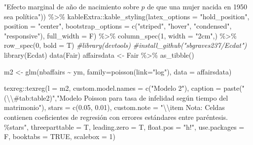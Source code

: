 \documentclass[
  12pt,
  a4paper,
]{article}
\newenvironment{Shaded}{\begin{snugshade}}{\end{snugshade}}
\newcommand{\AttributeTok}[1]{\textcolor[rgb]{0.77,0.63,0.00}{#1}}
\newcommand{\CommentTok}[1]{\textcolor[rgb]{0.56,0.35,0.01}{\textit{#1}}}
\newcommand{\ConstantTok}[1]{\textcolor[rgb]{0.00,0.00,0.00}{#1}}
\newcommand{\DecValTok}[1]{\textcolor[rgb]{0.00,0.00,0.81}{#1}}
\newcommand{\FloatTok}[1]{\textcolor[rgb]{0.00,0.00,0.81}{#1}}
\newcommand{\FunctionTok}[1]{\textcolor[rgb]{0.00,0.00,0.00}{#1}}
\newcommand{\NormalTok}[1]{#1}
\newcommand{\OtherTok}[1]{\textcolor[rgb]{0.56,0.35,0.01}{#1}}
\newcommand{\SpecialCharTok}[1]{\textcolor[rgb]{0.00,0.00,0.00}{#1}}
\newcommand{\StringTok}[1]{\textcolor[rgb]{0.31,0.60,0.02}{#1}}
\begin{document}
\begin{Shaded}
\begin{Highlighting}[]
                                    \StringTok{"Efecto marginal de año de nacimiento sobre $p$ de que una mujer nacida en 1950 sea política"}\NormalTok{)) }\SpecialCharTok{\%\textgreater{}\%} 
\NormalTok{  kableExtra}\SpecialCharTok{::}\FunctionTok{kable\_styling}\NormalTok{(}\AttributeTok{latex\_options =} \StringTok{"hold\_position"}\NormalTok{, }
                            \AttributeTok{position =} \StringTok{"center"}\NormalTok{, }
                            \AttributeTok{bootstrap\_options =} \FunctionTok{c}\NormalTok{(}\StringTok{"striped"}\NormalTok{, }\StringTok{"hover"}\NormalTok{, }
                                                  \StringTok{"condensed"}\NormalTok{, }\StringTok{"responsive"}\NormalTok{), }
                            \AttributeTok{full\_width =}\NormalTok{ F) }\SpecialCharTok{\%\textgreater{}\%} 
  \FunctionTok{column\_spec}\NormalTok{(}\DecValTok{1}\NormalTok{, }\AttributeTok{width =} \StringTok{"2cm"}\NormalTok{,) }\SpecialCharTok{\%\textgreater{}\%}
  \FunctionTok{row\_spec}\NormalTok{(}\DecValTok{0}\NormalTok{, }\AttributeTok{bold =}\NormalTok{ T)}
\CommentTok{\#library(devtools)}
\CommentTok{\#install\_github("sbgraves237/Ecdat")}
\FunctionTok{library}\NormalTok{(Ecdat)}
\FunctionTok{data}\NormalTok{(Fair)}
\NormalTok{affairsdata }\OtherTok{\textless{}{-}}\NormalTok{ Fair }\SpecialCharTok{\%\textgreater{}\%} \FunctionTok{as\_tibble}\NormalTok{()}

\NormalTok{m2 }\OtherTok{\textless{}{-}} \FunctionTok{glm}\NormalTok{(nbaffairs }\SpecialCharTok{\textasciitilde{}}\NormalTok{ ym, }\AttributeTok{family=}\FunctionTok{poisson}\NormalTok{(}\AttributeTok{link=}\StringTok{"log"}\NormalTok{), }\AttributeTok{data =}\NormalTok{ affairsdata)}

\NormalTok{texreg}\SpecialCharTok{::}\FunctionTok{texreg}\NormalTok{(}\AttributeTok{l =}\NormalTok{ m2,}
               \AttributeTok{custom.model.names =} \FunctionTok{c}\NormalTok{(}\StringTok{"Modelo 2"}\NormalTok{),}
               \AttributeTok{caption =} \FunctionTok{paste}\NormalTok{(}\StringTok{"(}\SpecialCharTok{\textbackslash{}\textbackslash{}}\StringTok{\#tab:table2)"}\NormalTok{,}\StringTok{"Modelo Poisson para tasa de infelidad según tiempo del matrimonio"}\NormalTok{),}
               \AttributeTok{stars =} \FunctionTok{c}\NormalTok{(}\FloatTok{0.05}\NormalTok{, }\FloatTok{0.01}\NormalTok{),}
               \AttributeTok{custom.note =} \StringTok{"}\SpecialCharTok{\textbackslash{}\textbackslash{}}\StringTok{item Nota: Celdas contienen coeficientes de regresión con errores estándares entre paréntesis. \%stars"}\NormalTok{,}
               \AttributeTok{threeparttable =}\NormalTok{ T,}
               \AttributeTok{leading.zero =}\NormalTok{ T,}
               \AttributeTok{float.pos =} \StringTok{"h!"}\NormalTok{,}
               \AttributeTok{use.packages =}\NormalTok{ F,}
               \AttributeTok{booktabs =} \ConstantTok{TRUE}\NormalTok{,}
               \AttributeTok{scalebox =} \DecValTok{1}\NormalTok{)}


\end{Highlighting}
\end{Shaded}
\end{document}
